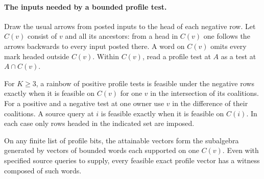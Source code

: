 \paragraph{The inputs needed by a bounded profile test.}
Draw the usual arrows from posted inputs to the head of each negative
row. Let $C(v)$ consist of $v$ and all its ancestors: from a head in
$C(v)$ one follows the arrows backwards to every input posted there.
A word on $C(v)$ omits every mark headed outside $C(v)$. Within $C(v)$,
read a profile test at $A$ as a test at $A\cap C(v)$.

\begin{theorem}
\label{core:thm:component-profile-factorization}
For $K\ge3$, a rainbow of positive profile tests is feasible under
the negative rows exactly when it is feasible on $C(v)$ for one
$v$ in the intersection of its coalitions. For a positive and a
negative test at one owner use $v$ in the difference of their coalitions.
A source query at $i$ is feasible exactly when it is feasible on $C(i)$.
In each case only rows headed in the indicated set are imposed.

On any finite list of profile bits, the attainable vectors form the
subalgebra generated by vectors of bounded words each supported on
one $C(v)$. Even with specified source queries to supply, every feasible
exact profile vector has a witness composed of such words.
\end{theorem}
